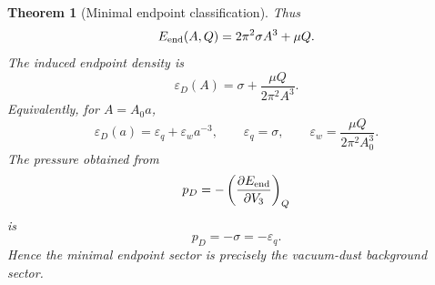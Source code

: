 \documentclass[11pt,a4paper]{article}
\numberwithin{equation}{section}
\newtheorem{theorem}[criterion]{Theorem}
\theoremstyle{remark}
\newcommand{\epsD}{\varepsilon_D}
\begin{document}
\begin{theorem}[Minimal endpoint classification]
Thus
\begin{equation}
E_{\rm end}(A,Q)
=2\pi^2\sigma A^3+\mu Q .
\end{equation}
The induced endpoint density is
\begin{equation}
\epsD(A)
=\sigma+\frac{\mu Q}{2\pi^2A^3}.
\end{equation}
Equivalently, for \(A=A_0a\),
\begin{equation}
\epsD(a)
=\varepsilon_q+\varepsilon_w a^{-3},
\qquad
\varepsilon_q=\sigma,
\qquad
\varepsilon_w=\frac{\mu Q}{2\pi^2A_0^3}.
\end{equation}
The pressure obtained from
\begin{equation}
p_D=-\left(\frac{\partial E_{\rm end}}{\partial V_3}\right)_Q
\end{equation}
is
\begin{equation}
p_D=-\sigma=-\varepsilon_q .
\end{equation}
Hence the minimal endpoint sector is precisely the vacuum-dust background sector.
\end{theorem}
\end{document}
